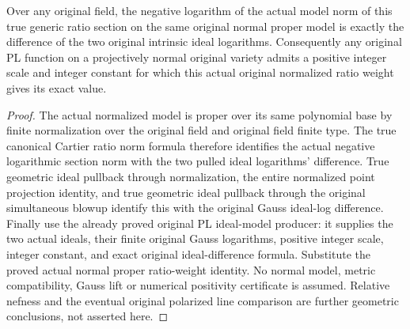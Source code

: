 \begin{theorem}
\label{thm:actual-original-normalized-simultaneous-ratio-weight}
\leanok
{}
Over any original field, the negative logarithm of the actual model
norm of this true generic ratio section on the same original normal proper
model is exactly the difference of the two original intrinsic ideal
logarithms. Consequently any original PL function on a projectively normal
original variety admits a positive integer scale and integer constant for
which this actual original normalized ratio weight gives its exact value.
\end{theorem}
\begin{proof}
The actual normalized model is proper over its same polynomial base by
finite normalization over the original field and original field finite type. The true
canonical Cartier ratio norm formula therefore identifies the actual negative
logarithmic section norm with the two pulled ideal logarithms' difference.
True geometric ideal pullback through normalization, the entire normalized
point projection identity, and true geometric ideal pullback through the
original simultaneous blowup identify this with the original Gauss ideal-log
difference. Finally use the already proved original PL ideal-model producer:
it supplies the two actual ideals, their finite original Gauss logarithms,
positive integer scale, integer constant, and exact original ideal-difference
formula. Substitute the proved actual normal proper ratio-weight identity.
No normal model, metric compatibility, Gauss lift or numerical positivity
certificate is assumed. Relative nefness and the eventual original polarized
line comparison are further geometric conclusions, not asserted here.
\end{proof}
